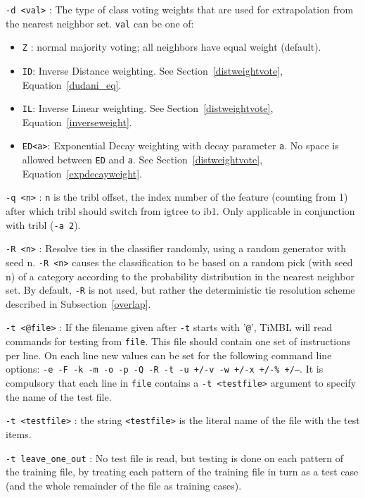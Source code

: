 \documentclass{report}
\begin{document}
\begin{description}
\item {\tt -d <val>} : The type of class voting weights that are used for
extrapolation from the nearest neighbor set. {\tt val} can be one of:
	\begin{itemize} 
  	\item {\tt Z} : normal majority voting; all neighbors have
         equal weight (default).
  	\item {\tt ID}: Inverse Distance weighting. See Section~\ref{distweightvote}, Equation~\ref{dudani_eq}.
  	\item {\tt IL}: Inverse Linear weighting. See Section~\ref{distweightvote}, Equation~\ref{inverseweight}.
  	\item {\tt ED<a>}: Exponential Decay weighting with decay parameter {\tt a}. No space is allowed between {\tt ED} and {\tt a}. See Section~\ref{distweightvote}, Equation~\ref{expdecayweight}.
\end{itemize}

\item {\tt -q <n>} : {\tt n} is the {\sc tribl} offset, the index
number of the feature (counting from 1) after which {\sc tribl} should
switch from {\sc igtree} to {\sc ib1}. Only applicable in conjunction
with {\sc tribl} ({\tt -a 2}).

\item {\tt -R <n>} : Resolve ties in the classifier randomly, using a
random generator with seed n. {\tt -R <n>} causes the classification
to be based on a random pick (with seed n) of a category according to
the probability distribution in the nearest neighbor set. By default,
{\tt -R} is not used, but rather the deterministic tie resolution
scheme described in Subsection~\ref{overlap}.

\item {\tt -t <@file>} : If the filename given after {\tt -t} starts
with '{\tt @}', TiMBL will read commands for testing from {\tt file}.
This file should contain one set of instructions per line. On each
line new values can be set for the following command line options:
{\tt -e -F -k -m -o -p -Q -R -t -u +/-v -w +/-x +/-\% +/--}. It is compulsory
that each line in {\tt file} contains a {\tt -t <testfile>} argument
to specify the name of the test file.

\item {\tt -t <testfile>} : the string {\tt <testfile>} is the literal name
of the file with the test items.

\item {\tt -t leave\_one\_out} : No test file is read, but testing is
done on each pattern of the training file, by treating each pattern of
the training file in turn as a test case (and the whole remainder of
the file as training cases).


\end{description}
\end{document}
